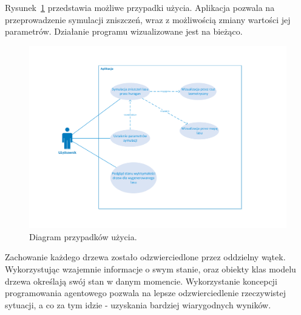  Rysunek~\ref{fig:uml2} przedstawia możliwe przypadki użycia. Aplikacja pozwala na przeprowadzenie symulacji zniszczeń, wraz z możliwością zmiany wartości jej parametrów. Działanie programu wizualizowane jest na bieżąco.

\begin{figure}[!h]
	\center
	\includegraphics[scale=0.5]{uml_use_case}
	\caption{Diagram przypadków użycia.}
	\label{fig:uml2}
\end{figure} 

Zachowanie każdego drzewa zostało odzwierciedlone przez oddzielny wątek. Wykorzystując wzajemnie informacje o swym stanie, oraz obiekty klas modelu drzewa określają swój stan w danym momencie. Wykorzystanie koncepcji programowania agentowego pozwala na lepsze odzwierciedlenie rzeczywistej sytuacji, a co za tym idzie - uzyskania bardziej wiarygodnych wyników.





